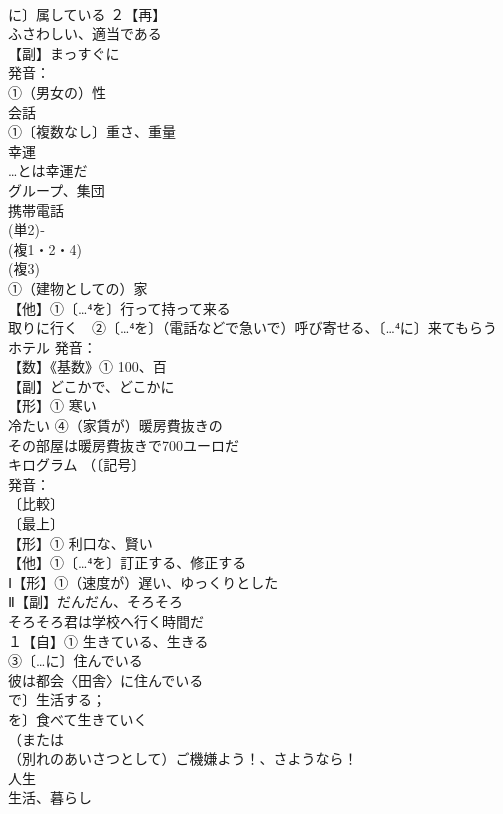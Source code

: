 \documentclass[8pt]{extreport}
\begin{document}
\begin{CJK}{UTF8}{min}
\\	に〕属している ２【再】
\\	ふさわしい、適当である 
\\	【副】まっすぐに 
\\	発音：
\\	①（男女の）性 
\\	会話 
\\	①〔複数なし〕重さ、重量 
\\	幸運 
\\	…とは幸運だ
\\	グループ、集団 
\\	携帯電話 
\\	(単2)‐
\\	(複1・2・4)
\\	(複3)
\\	①（建物としての）家 
\\	【他】①〔…⁴を〕行って持って来る 
\\	取りに行く　②〔…⁴を〕（電話などで急いで）呼び寄せる、〔…⁴に〕来てもらう 
\\	ホテル 発音：
\\	【数】《基数》① 100、百 
\\	【副】どこかで、どこかに 
\\	【形】① 寒い 
\\	冷たい ④（家賃が）暖房費抜きの　
\\	その部屋は暖房費抜きで700ユーロだ 
\\	キログラム （〔記号〕
\\	発音：
\\	〔比較〕
\\	〔最上〕
\\	【形】① 利口な、賢い 
\\	【他】①〔…⁴を〕訂正する、修正する 
\\	Ⅰ【形】①（速度が）遅い、ゆっくりとした 
\\	Ⅱ【副】だんだん、そろそろ 
\\	そろそろ君は学校へ行く時間だ 
\\	１【自】① 生きている、生きる 
\\	③〔…に〕住んでいる 
\\	彼は都会〈田舎〉に住んでいる 
\\	で〕生活する；
\\	を〕食べて生きていく 
\\	（または
\\	（別れのあいさつとして）ご機嫌よう！、さようなら！
\\	人生　
\\	生活、暮らし

\end{CJK}
\end{document}
